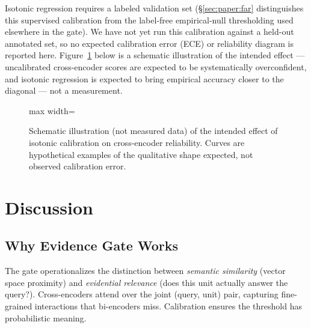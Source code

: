 Isotonic regression requires a labeled validation set (\S\ref{sec:paper:far} distinguishes this supervised calibration from the label-free empirical-null thresholding used elsewhere in the gate). We have not yet run this calibration against a held-out annotated set, so no expected calibration error (ECE) or reliability diagram is reported here. Figure~\ref{fig:calibration-schematic} below is a schematic illustration of the intended effect --- uncalibrated cross-encoder scores are expected to be systematically overconfident, and isotonic regression is expected to bring empirical accuracy closer to the diagonal --- not a measurement.

\begin{figure}[htbp]
\centering
\begin{adjustbox}{max width=\textwidth}
\end{adjustbox}
\caption{Schematic illustration (not measured data) of the intended effect of isotonic calibration on cross-encoder reliability. Curves are hypothetical examples of the qualitative shape expected, not observed calibration error.}
\label{fig:calibration-schematic}
\end{figure}

\section{Discussion}
\label{sec:paper:discussion}

\subsection{Why Evidence Gate Works}
The gate operationalizes the distinction between \emph{semantic similarity} (vector space proximity) and \emph{evidential relevance} (does this unit actually answer the query?). Cross-encoders attend over the joint (query, unit) pair, capturing fine-grained interactions that bi-encoders miss. Calibration ensures the threshold has probabilistic meaning.

